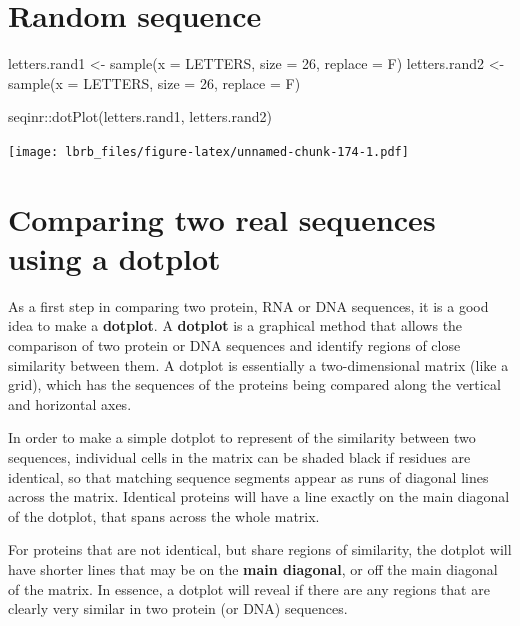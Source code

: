 \documentclass[
]{book}
\newenvironment{Shaded}{\begin{snugshade}}{\end{snugshade}}
\newcommand{\AttributeTok}[1]{\textcolor[rgb]{0.77,0.63,0.00}{#1}}
\newcommand{\DecValTok}[1]{\textcolor[rgb]{0.00,0.00,0.81}{#1}}
\newcommand{\FunctionTok}[1]{\textcolor[rgb]{0.00,0.00,0.00}{#1}}
\newcommand{\NormalTok}[1]{#1}
\newcommand{\OtherTok}[1]{\textcolor[rgb]{0.56,0.35,0.01}{#1}}
\newcommand{\SpecialCharTok}[1]{\textcolor[rgb]{0.00,0.00,0.00}{#1}}
\begin{document}
\hypertarget{random-sequence}{%
\section{Random sequence}\label{random-sequence}}

\begin{Shaded}
\begin{Highlighting}[]
\NormalTok{letters.rand1 }\OtherTok{\textless{}{-}} \FunctionTok{sample}\NormalTok{(}\AttributeTok{x =}\NormalTok{ LETTERS, }\AttributeTok{size =} \DecValTok{26}\NormalTok{, }\AttributeTok{replace =}\NormalTok{ F)}
\NormalTok{letters.rand2 }\OtherTok{\textless{}{-}} \FunctionTok{sample}\NormalTok{(}\AttributeTok{x =}\NormalTok{ LETTERS, }\AttributeTok{size =} \DecValTok{26}\NormalTok{, }\AttributeTok{replace =}\NormalTok{ F)}


\NormalTok{seqinr}\SpecialCharTok{::}\FunctionTok{dotPlot}\NormalTok{(letters.rand1, }
\NormalTok{                letters.rand2)}
\end{Highlighting}
\end{Shaded}

\texttt{[image: lbrb\_files/figure-latex/unnamed-chunk-174-1.pdf]}

\hypertarget{comparing-two-real-sequences-using-a-dotplot}{%
\section{Comparing two real sequences using a dotplot}\label{comparing-two-real-sequences-using-a-dotplot}}

As a first step in comparing two protein, RNA or DNA sequences, it is a good idea to make a \textbf{dotplot}. A \textbf{dotplot} is a graphical method that allows the comparison of two protein or DNA sequences and identify regions of close similarity between them. A dotplot is essentially a two-dimensional matrix (like a grid), which has the sequences of the proteins being compared along the vertical and horizontal axes.

In order to make a simple dotplot to represent of the similarity between two sequences, individual cells in the matrix can be shaded black if residues are identical, so that matching sequence segments appear as runs of diagonal lines across the matrix. Identical proteins will have a line exactly on the main diagonal of the dotplot, that spans across the whole matrix.

For proteins that are not identical, but share regions of similarity, the dotplot will have shorter lines that may be on the \textbf{main diagonal}, or off the main diagonal of the matrix. In essence, a dotplot will reveal if there are any regions that are clearly very similar in two protein (or DNA) sequences.
\end{document}
